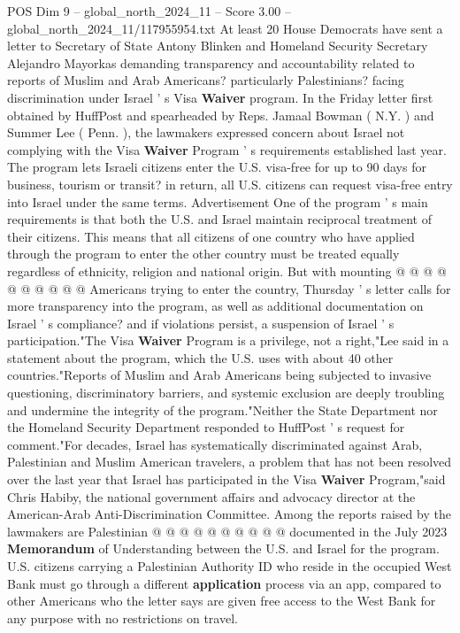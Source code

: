 \begin{textsample}{POS Dim 9 – global\_north\_2024\_11 – Score 3.00 – global\_north\_2024\_11/117955954.txt}  \label{ex:f9_pos_235}
At least 20 House Democrats have sent a letter to Secretary of State Antony Blinken and Homeland Security Secretary Alejandro Mayorkas demanding transparency and accountability related to reports of Muslim and Arab Americans? particularly Palestinians? facing discrimination under Israel ' s Visa \textbf{Waiver} program.
In the Friday letter first obtained by HuffPost and spearheaded by Reps.
Jamaal Bowman ( N.Y. ) and Summer Lee ( Penn. ), the lawmakers expressed concern about Israel not complying with the Visa \textbf{Waiver} Program ' s requirements established last year.
The program lets Israeli citizens enter the U.S. visa-free for up to 90 days for business, tourism or transit? in return, all U.S. citizens can request visa-free entry into Israel under the same terms.
Advertisement One of the program ' s main requirements is that both the U.S. and Israel maintain reciprocal treatment of their citizens.
This means that all citizens of one country who have applied through the program to enter the other country must be treated equally regardless of ethnicity, religion and national origin.
But with mounting @ @ @ @ @ @ @ @ @ @ Americans trying to enter the country, Thursday ' s letter calls for more transparency into the program, as well as additional documentation on Israel ' s compliance? and if violations persist, a suspension of Israel ' s participation."The Visa \textbf{Waiver} Program is a privilege, not a right,"Lee said in a statement about the program, which the U.S. uses with about 40 other countries."Reports of Muslim and Arab Americans being subjected to invasive questioning, discriminatory barriers, and systemic exclusion are deeply troubling and undermine the integrity of the program."Neither the State Department nor the Homeland Security Department responded to HuffPost ' s request for comment."For decades, Israel has systematically discriminated against Arab, Palestinian and Muslim American travelers, a problem that has not been resolved over the last year that Israel has participated in the Visa \textbf{Waiver} Program,"said Chris Habiby, the national government affairs and advocacy director at the American-Arab Anti-Discrimination Committee.
Among the reports raised by the lawmakers are Palestinian @ @ @ @ @ @ @ @ @ @ documented in the July 2023 \textbf{Memorandum} of Understanding between the U.S. and Israel for the program.
U.S. citizens carrying a Palestinian Authority ID who reside in the occupied West Bank must go through a different \textbf{application} process via an app, compared to other Americans who the letter says are given free access to the West Bank for any purpose with no restrictions on travel.

\end{textsample}
